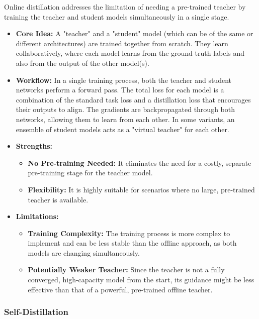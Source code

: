 Online distillation addresses the limitation of needing a pre-trained teacher by training the teacher and student models simultaneously in a single stage.

\begin{itemize}
    \item \textbf{Core Idea:} A "teacher" and a "student" model (which can be of the same or different architectures) are trained together from scratch. They learn collaboratively, where each model learns from the ground-truth labels and also from the output of the other model(s).
    \item \textbf{Workflow:} In a single training process, both the teacher and student networks perform a forward pass. The total loss for each model is a combination of the standard task loss and a distillation loss that encourages their outputs to align. The gradients are backpropagated through both networks, allowing them to learn from each other. In some variants, an ensemble of student models acts as a "virtual teacher" for each other.
    \item \textbf{Strengths:}
        \begin{itemize}
            \item \textbf{No Pre-training Needed:} It eliminates the need for a costly, separate pre-training stage for the teacher model.
            \item \textbf{Flexibility:} It is highly suitable for scenarios where no large, pre-trained teacher is available.
        \end{itemize}
    \item \textbf{Limitations:}
        \begin{itemize}
            \item \textbf{Training Complexity:} The training process is more complex to implement and can be less stable than the offline approach, as both models are changing simultaneously.
            \item \textbf{Potentially Weaker Teacher:} Since the teacher is not a fully converged, high-capacity model from the start, its guidance might be less effective than that of a powerful, pre-trained offline teacher.
        \end{itemize}
\end{itemize}

\subsubsection{Self-Distillation}
\label{ssec:self_distillation}

